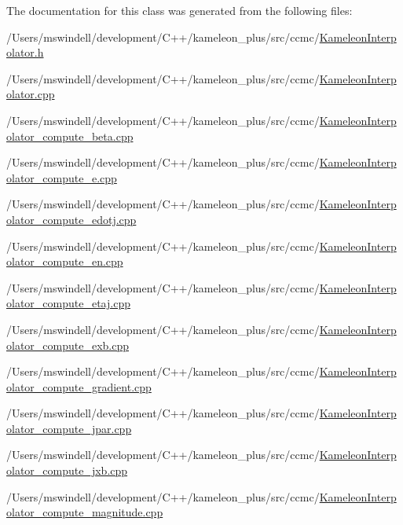 The documentation for this class was generated from the following files\-:\begin{DoxyCompactItemize}
\item 
/\-Users/mswindell/development/\-C++/kameleon\-\_\-plus/src/ccmc/\hyperlink{_kameleon_interpolator_8h}{Kameleon\-Interpolator.\-h}\item 
/\-Users/mswindell/development/\-C++/kameleon\-\_\-plus/src/ccmc/\hyperlink{_kameleon_interpolator_8cpp}{Kameleon\-Interpolator.\-cpp}\item 
/\-Users/mswindell/development/\-C++/kameleon\-\_\-plus/src/ccmc/\hyperlink{_kameleon_interpolator__compute__beta_8cpp}{Kameleon\-Interpolator\-\_\-compute\-\_\-beta.\-cpp}\item 
/\-Users/mswindell/development/\-C++/kameleon\-\_\-plus/src/ccmc/\hyperlink{_kameleon_interpolator__compute__e_8cpp}{Kameleon\-Interpolator\-\_\-compute\-\_\-e.\-cpp}\item 
/\-Users/mswindell/development/\-C++/kameleon\-\_\-plus/src/ccmc/\hyperlink{_kameleon_interpolator__compute__edotj_8cpp}{Kameleon\-Interpolator\-\_\-compute\-\_\-edotj.\-cpp}\item 
/\-Users/mswindell/development/\-C++/kameleon\-\_\-plus/src/ccmc/\hyperlink{_kameleon_interpolator__compute__en_8cpp}{Kameleon\-Interpolator\-\_\-compute\-\_\-en.\-cpp}\item 
/\-Users/mswindell/development/\-C++/kameleon\-\_\-plus/src/ccmc/\hyperlink{_kameleon_interpolator__compute__etaj_8cpp}{Kameleon\-Interpolator\-\_\-compute\-\_\-etaj.\-cpp}\item 
/\-Users/mswindell/development/\-C++/kameleon\-\_\-plus/src/ccmc/\hyperlink{_kameleon_interpolator__compute__exb_8cpp}{Kameleon\-Interpolator\-\_\-compute\-\_\-exb.\-cpp}\item 
/\-Users/mswindell/development/\-C++/kameleon\-\_\-plus/src/ccmc/\hyperlink{_kameleon_interpolator__compute__gradient_8cpp}{Kameleon\-Interpolator\-\_\-compute\-\_\-gradient.\-cpp}\item 
/\-Users/mswindell/development/\-C++/kameleon\-\_\-plus/src/ccmc/\hyperlink{_kameleon_interpolator__compute__jpar_8cpp}{Kameleon\-Interpolator\-\_\-compute\-\_\-jpar.\-cpp}\item 
/\-Users/mswindell/development/\-C++/kameleon\-\_\-plus/src/ccmc/\hyperlink{_kameleon_interpolator__compute__jxb_8cpp}{Kameleon\-Interpolator\-\_\-compute\-\_\-jxb.\-cpp}\item 
/\-Users/mswindell/development/\-C++/kameleon\-\_\-plus/src/ccmc/\hyperlink{_kameleon_interpolator__compute__magnitude_8cpp}{Kameleon\-Interpolator\-\_\-compute\-\_\-magnitude.\-cpp}\item 

\end{DoxyCompactItemize}
